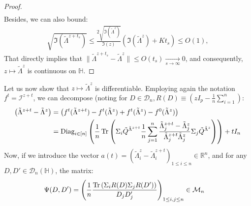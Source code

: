 \documentclass[a4papaer, titlepage]{book}
\begin{document}
\begin{proof}
\begin{align*}
  \end{align*}
  Besides, we can also bound:
  \begin{align*}
    \sqrt{\Im(\tilde \Lambda^{z+t_s})} \leq \frac{2\sqrt{\Im(\tilde \Lambda^z)}}{\Im(z)}(\Im(\tilde \Lambda^z) + Kt_s)\leq O(1),
  \end{align*}
  That directly implies that $\|\tilde \Lambda^{z+t_s}-\tilde \Lambda^z\| \leq O(t_s) \underset{s \to \infty}{\longrightarrow} 0$, and consequently, $z \mapsto \tilde \Lambda^z$ is continuous on $\mathbb H$.
  \end{proof}
  Let us now show that $z \mapsto\tilde \Lambda^z$ is differentiable. Employing again the notation $f^t =  \mathcal I^{z+t}$, we can decompose (noting for $D\in \mathcal{D}_{n}, R(D) \equiv (zI_p - \frac{1}{n} \sum_{i=1}^n )$:
  \begin{align*}
    \left(\tilde \Lambda^{z+t}-\tilde \Lambda^z\right)
    &=  \left(f^{t}(\tilde \Lambda^{z+t})-f^{t}(\tilde \Lambda^z) + f^{t}(\tilde \Lambda^{z})-f^{0}(\tilde \Lambda^z)\right)\\
    & =  \operatorname{Diag}_{i \in[n]}\left(\frac{1}{n}\operatorname{Tr} \left(\Sigma_i \tilde Q^{\tilde \Lambda^{z+t}}\frac{1}{n} \sum_{j=1}^n \frac{\tilde \Lambda^{z+t}_j - \tilde \Lambda^z_j}{\tilde \Lambda^{z+t}_j\tilde \Lambda^z_j}\Sigma_j \tilde Q^{\tilde \Lambda^{z}} \right)\right) + t I_n
  \end{align*}
  Now, if we introduce the vector $a(t) = \left(\tilde \Lambda_i^z - \tilde \Lambda_i^{z+t}\right)_{1\leq i\leq n} \in \mathbb R^n$,
  and for any $D,D' \in \mathcal D_n(\mathbb H)$, the matrix:
  \begin{align*}
    \Psi(D,D') = \left(\frac{1}{n}\frac{\operatorname{Tr} \left(\Sigma_i R(D)\Sigma_jR(D')\right)}{D_jD'_j}\right)_{1\leq  i, j \leq n} \in \mathcal M_{n}&
  \end{align*}
\end{document}
